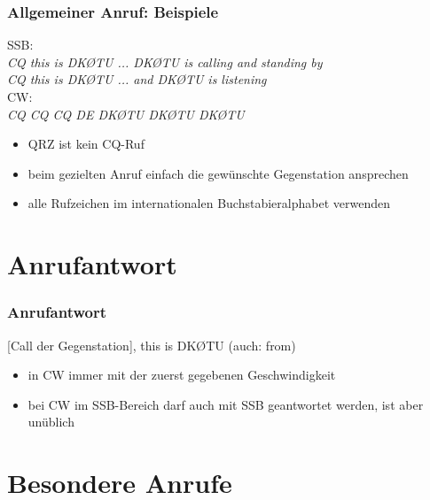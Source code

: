 \begin{frame}
  \frametitle{Allgemeiner Anruf: Beispiele}

  SSB: \\
  \emph{CQ this is DKØTU ... DKØTU is calling and standing by} \\
  \emph{CQ this is DKØTU ... and DKØTU is listening}\\[2em]

  CW: \\
  \emph{CQ CQ CQ DE DKØTU DKØTU DKØTU} \\[2em]

  \begin{itemize}
    \item QRZ ist kein CQ-Ruf
    \item beim gezielten Anruf einfach die gewünschte Gegenstation ansprechen
    \item alle Rufzeichen im internationalen Buchstabieralphabet verwenden
  \end{itemize}

\end{frame}

\section{Anrufantwort}

\begin{frame}
  \frametitle{Anrufantwort}

  [Call der Gegenstation], this is DKØTU (auch: from)

  \begin{itemize}
    \item in CW immer mit der zuerst gegebenen Geschwindigkeit
    \item bei CW im SSB-Bereich darf auch mit SSB geantwortet werden, ist aber
      unüblich
  \end{itemize}

\end{frame}

\section{Besondere Anrufe}

